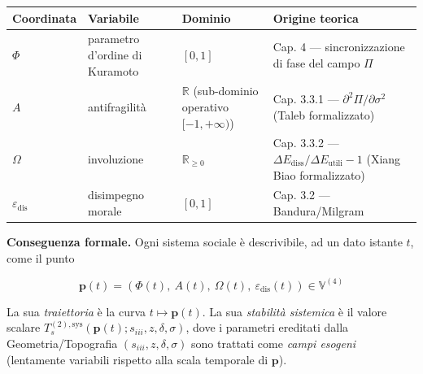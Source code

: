 {\def\LTcaptype{none} %
{\small\begin{longtable}[]{@{}
  >{\raggedright\arraybackslash}p{}
  >{\raggedright\arraybackslash}p{}
  >{\raggedright\arraybackslash}p{}
  >{\raggedright\arraybackslash}p{}@{}}
\toprule\noalign{}
\begin{minipage}[b]{\linewidth}\raggedright
Coordinata
\end{minipage} & \begin{minipage}[b]{\linewidth}\raggedright
Variabile
\end{minipage} & \begin{minipage}[b]{\linewidth}\raggedright
Dominio
\end{minipage} & \begin{minipage}[b]{\linewidth}\raggedright
Origine teorica
\end{minipage} \\
\midrule\noalign{}
\endhead
\bottomrule\noalign{}
\endlastfoot
\(\Phi\) & parametro d'ordine di Kuramoto & \([0, 1]\) & Cap. 4 ---
sincronizzazione di fase del campo \(\Pi\) \\
\(A\) & antifragilità & \(\mathbb{R}\) (sub-dominio operativo
\([-1, +\infty)\)) & Cap. 3.3.1 --- \(\partial^2\Pi/\partial\sigma^2\)
(Taleb formalizzato) \\
\(\Omega\) & involuzione & \(\mathbb{R}_{\geq 0}\) & Cap. 3.3.2 ---
\(\Delta E_{\text{diss}}/\Delta E_{\text{utili}} - 1\) (Xiang Biao
formalizzato) \\
\(\varepsilon_{\text{dis}}\) & disimpegno morale & \([0, 1]\) & Cap. 3.2
--- Bandura/Milgram \\
\end{longtable}}
}

\Proved{} \textbf{Conseguenza formale.} Ogni sistema sociale è
descrivibile, ad un dato istante \(t\), come il punto

\[
\boldsymbol{p}(t) = (\Phi(t),\ A(t),\ \Omega(t),\ \varepsilon_{\text{dis}}(t)) \in \mathbb{V}^{(4)}
\]

La sua \emph{traiettoria} è la curva \(t \mapsto \boldsymbol{p}(t)\). La
sua \emph{stabilità sistemica} è il valore scalare
\(T_s^{(2),\text{sys}}(\boldsymbol{p}(t); s_{iii}, z, \delta, \sigma)\),
dove i parametri ereditati dalla Geometria/Topografia
\((s_{iii}, z, \delta, \sigma)\) sono trattati come \emph{campi esogeni}
(lentamente variabili rispetto alla scala temporale di
\(\boldsymbol{p}\)).

